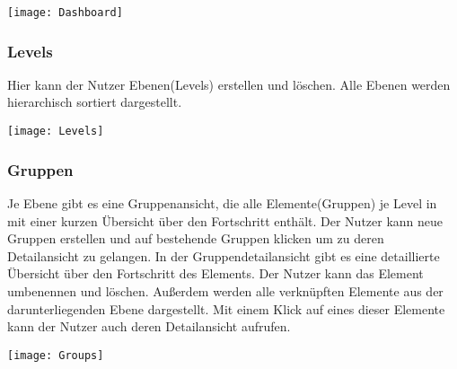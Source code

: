 \vspace{20pt}
\begin{center}
    \begin{minipage}{\linewidth}
        \texttt{[image: Dashboard]}
    \end{minipage}
\end{center}
\vspace{20pt}

\subsubsection{Levels}
Hier kann der Nutzer Ebenen(Levels) erstellen und löschen. Alle Ebenen werden hierarchisch sortiert dargestellt.

\vspace{20pt}
\begin{center}
    \begin{minipage}{\linewidth}
        \texttt{[image: Levels]}
    \end{minipage}
\end{center}
\vspace{20pt}

\subsubsection{Gruppen}
Je Ebene gibt es eine Gruppenansicht, die alle Elemente(Gruppen) je Level in mit einer kurzen Übersicht über den Fortschritt enthält. Der Nutzer kann neue Gruppen erstellen und auf bestehende Gruppen klicken um zu deren Detailansicht zu gelangen.
In der Gruppendetailansicht gibt es eine detaillierte Übersicht über den Fortschritt des Elements. Der Nutzer kann das Element umbenennen und löschen. Außerdem werden alle verknüpften Elemente aus der darunterliegenden Ebene dargestellt. Mit einem Klick auf eines dieser Elemente kann der Nutzer auch deren Detailansicht aufrufen.

\vspace{20pt}
\begin{center}
    \begin{minipage}{\linewidth}
        \texttt{[image: Groups]}
    \end{minipage}
\end{center}
\vspace{20pt}

